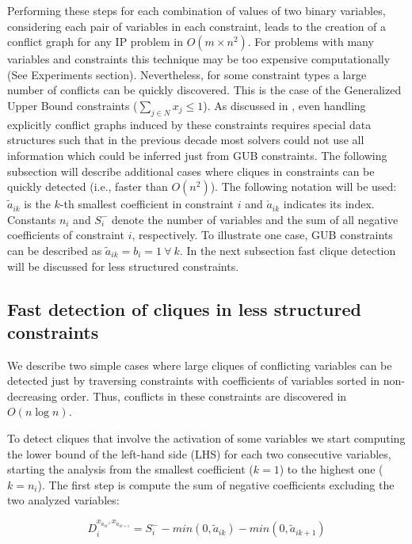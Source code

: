 \documentclass{endm}
\begin{document}
Performing these steps for each combination of values of two binary variables, considering each pair of variables in each constraint, leads to the creation of a conflict graph for any IP problem in $O(m \times n^2)$. For problems with many variables and constraints this technique may be too expensive computationally (See Experiments section). Nevertheless, for some constraint types a large number of conflicts can be quickly discovered. This is the case of the Generalized Upper Bound constraints ($\sum_{j\in N}x_j \leq 1$). As discussed in \cite{atamturk}, even handling explicitly conflict graphs induced by these constraints requires special data structures such that in the previous decade most solvers could not use all information which could be inferred just from GUB constraints. The following subsection will describe additional cases where cliques in constraints can be quickly detected (i.e., faster than $O(n^2)$). The following notation will be used: $\tilde{a}_{ik}$ is the $k$-th smallest coefficient in constraint $i$ and $\acute{a}_{ik}$ indicates its index. Constants $n_i$ and $S_i^-$ denote the number of variables and the sum of all negative coefficients of constraint $i$, respectively. To illustrate one case, GUB constraints can be described as $\tilde{a}_{ik}=b_i=1 \ \forall \ k$. In the next subsection fast clique detection will be discussed for less structured constraints.


\subsection{Fast detection of cliques in less structured constraints}

We describe two simple cases where large cliques of conflicting variables can be detected just by traversing constraints with  coefficients of variables sorted in non-decreasing order. Thus, conflicts in these constraints are discovered in $O( n \log n)$.

To detect cliques that involve the activation of some variables we start computing the lower bound of the left-hand side (LHS) for each two consecutive variables, starting the analysis from the smallest coefficient ($k=1$) to the highest one ($k=n_i$). The first step is compute the sum of negative coefficients excluding the two analyzed variables:

\begin{equation}\label{di}
D_{i}^{x_{\acute{a}_{ik}}, x_{\acute{a}_{ik+1}}} = S_i^- - min(0, \tilde{a}_{ik}) - min(0, \tilde{a}_{ik+1})
\end{equation}
\end{document}
